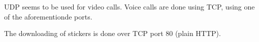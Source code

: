 \documentclass[conference]{IEEEtran}
\begin{document}
UDP seems to be used for video calls. Voice calls are done using TCP, using one
of the aforementionde ports.

The downloading of stickers is done over TCP port 80 (plain HTTP).


%
%
%





\printbibliography
\end{document}

